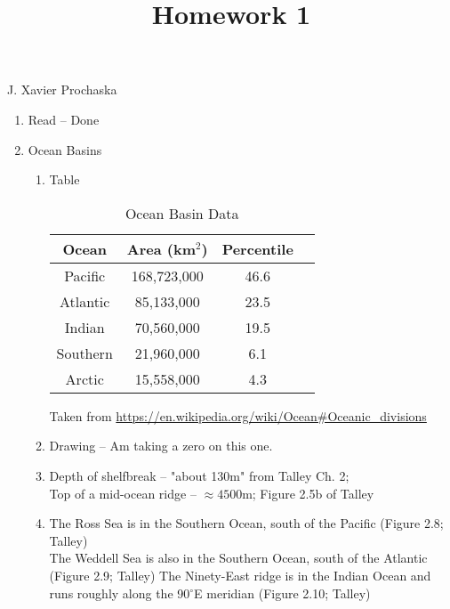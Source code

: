 \documentclass[11pt,letterpaper]{article}
\begin{document}
\title{Homework 1}

\maketitle

\begin{center}
J. Xavier Prochaska
\end{center}

\begin{enumerate}
\item Read -- Done

\item Ocean Basins

\begin{enumerate}

\item Table

\begin{table}[ht]
\caption{Ocean Basin Data}
\label{tab:dla}
\begin{center}
\begin{tabular}{cccc}
\hline
Ocean & Area (km$^2$) & Percentile \\
\hline
Pacific & 168,723,000 & 46.6 \\
Atlantic & 85,133,000 & 23.5 \\
Indian & 70,560,000 & 19.5 \\
Southern & 21,960,000 & 6.1 \\
Arctic & 15,558,000 & 4.3 \\
\hline
\end{tabular}
\end{center}
\end{table}
Taken from \url{https://en.wikipedia.org/wiki/Ocean#Oceanic_divisions}


\item Drawing -- Am taking a zero on this one.

\item Depth of shelfbreak -- "about 130m" from Talley Ch. 2;  \\
Top of a mid-ocean ridge -- $\approx 4500$m;  Figure 2.5b of Talley

\item The Ross Sea is in the Southern Ocean, south of the Pacific (Figure 2.8; Talley) \\
The Weddell Sea is also in the Southern Ocean, south of the Atlantic (Figure 2.9; Talley)
The Ninety-East ridge is in the Indian Ocean and runs roughly along the 90$^\circ$E meridian
(Figure 2.10; Talley)


\end{enumerate}
\end{enumerate}
\end{document}
